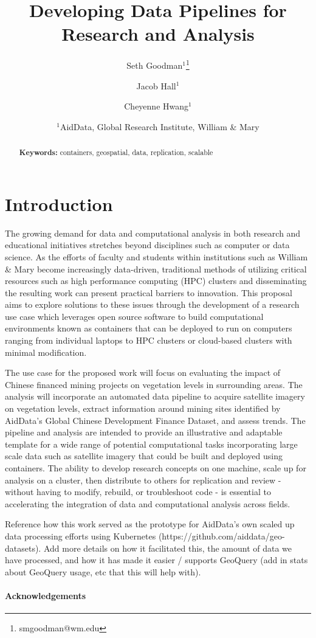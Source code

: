 \documentclass[a4paper]{article}
\title{Developing Data Pipelines for Research and Analysis}
\author{Seth Goodman$^1$\thanks{smgoodman@wm.edu} \and Jacob Hall$^1$ \and Cheyenne Hwang$^1$}
\date{
    $^1$AidData, Global Research Institute, William \& Mary \\ 
}
\begin{document}
\maketitle


\begin{abstract}
\lipsum[1]

\noindent\textbf{Keywords:} containers, geospatial, data, replication, scalable
\end{abstract}


\section{Introduction}
	
The growing demand for data and computational analysis in both research and educational initiatives stretches beyond disciplines such as computer or data science. As the efforts of faculty and students within institutions such as William \& Mary become increasingly data-driven, traditional methods of utilizing critical resources such as high performance computing (HPC) clusters and disseminating the resulting work can present practical barriers to innovation. This proposal aims to explore solutions to these issues through the development of a research use case which leverages open source software to build computational environments known as containers that can be deployed to run on computers ranging from individual laptops to HPC clusters or cloud-based clusters with minimal modification.

The use case for the proposed work will focus on evaluating the impact of Chinese financed mining projects on vegetation levels in surrounding areas. The analysis will incorporate an automated data pipeline to acquire satellite imagery on vegetation levels, extract information around mining sites identified by AidData's Global Chinese Development Finance Dataset, and assess trends. The pipeline and analysis are intended to provide an illustrative and adaptable template for a wide range of potential computational tasks incorporating large scale data such as satellite imagery that could be built and deployed using containers. The ability to develop research concepts on one machine, scale up for analysis on a cluster, then distribute to others for replication and review - without having to modify, rebuild, or troubleshoot code - is essential to accelerating the integration of data and computational analysis across fields.


Reference how this work served as the prototype for AidData's own scaled up data processing efforts using Kubernetes (https://github.com/aiddata/geo-datasets). Add more details on how it facilitated this, the amount of data we have processed, and how it has made it easier / supports GeoQuery (add in stats about GeoQuery usage, etc that this will help with).

	

\paragraph{Acknowledgements} 

\lipsum[6]


	
\end{document}
